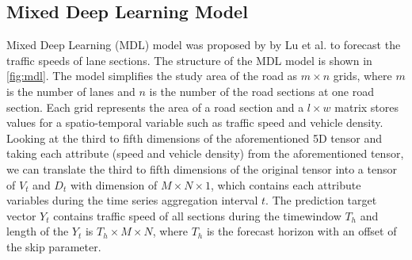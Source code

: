 \documentclass[11pt]{uonthesis}
\begin{document}
\subsection{Mixed Deep Learning Model}

Mixed Deep Learning (MDL) model was proposed by by Lu et al. \cite{9284587} to forecast the traffic speeds of lane sections. The structure of the MDL model is shown in \ref{fig:mdl}. The model simplifies the study area of the road as $m{\times}n$ grids, where $m$ is the number of lanes and $n$ is the number of the road sections at one road section. Each grid represents the area of a road section and a $l{\times}w$ matrix stores values for a spatio-temporal variable such as traffic speed and vehicle density. Looking at the third to fifth dimensions of the aforementioned 5D tensor and taking each attribute (speed and vehicle density) from the aforementioned tensor, we can translate the third to fifth dimensions of the original tensor into a tensor of ${V_t}$ and ${D_t}$ with dimension of $M{\times}N{\times}1$, which contains each attribute variables during the time series aggregation interval $t$. The prediction target vector $Y_t$ contains traffic speed of all sections during the timewindow $T_h$ and length of the $Y_t$ is $T_h{\times}M{\times}N$, where $T_h$ is the forecast horizon with an offset of the skip parameter. %
\end{document}
